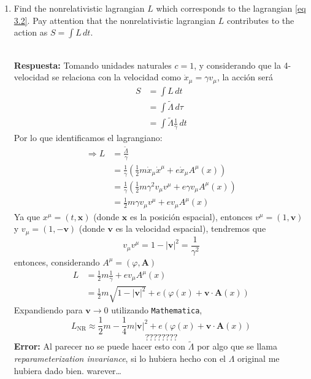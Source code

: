 \documentclass[]{article}
\numberwithin{equation}{section}
\newcommand{\0}{\textcolor{gray}{0}}
\newcommand{\n}[1]{\mathbf{#1}}
\newcommand{\resp}{
	\\
	
	\textbf{Respuesta:} }
\begin{document}
\begin{enumerate}
	\item[(d)] Find the nonrelativistic lagrangian $L$ which corresponds to the lagrangian \ref{eq 3.2}. Pay attention that the nonrelativistic lagrangian $L$ contributes to the action as $S = \int L \, dt$.
	\resp Tomando unidades naturales $c = 1$, y considerando que la 4-velocidad se relaciona con la velocidad como $\dot{x}_\mu = \gamma v_\mu$, la acción será
	\begin{align*}
		S &= \int L \, dt\\
		&= \int \tilde{\Lambda} \, d\tau \\
		&= \int \tilde{\Lambda} \frac{1}{\gamma} \, dt
	\end{align*}
	Por lo que identificamos el lagrangiano:
	\begin{align*}
		\Rightarrow L &= \frac{\tilde{\Lambda}}{\gamma}\\
		&= \frac{1}{\gamma} \left(\frac{1}{2} m \dot{x}_\mu \dot{x}^\mu + e\dot{x}_\mu A^\mu (x) \right)\\
		&= \frac{1}{\gamma} \left(\frac{1}{2} m \gamma^2 v_\mu v^\mu + e \gamma v_\mu A^\mu (x) \right)\\
		&= \frac{1}{2} m \gamma v_\mu v^\mu + e v_\mu A^\mu (x)
	\end{align*}
	Ya que $x^\mu = (t, \n{x})$ (donde $\n{x}$ es la posición espacial), entonces $v^\mu = (1, \n{v})$ y $v_\mu = (1, -\n{v})$ (donde $\n{v}$ es la velocidad espacial), tendremos que
	\begin{equation*}
		v_\mu v^\mu = 1 - |\n{v}|^2 = \frac{1}{\gamma^2}
	\end{equation*}
	entonces, considerando $A^\mu = (\varphi, \n{A})$
	\begin{align*}
		L &= \frac{1}{2} m \frac{1}{\gamma} + e v_\mu A^\mu (x)\\
		&= \frac{1}{2} m \sqrt{1 - |\n{v}|^2} + e \left(\varphi (x) + \n{v} \cdot \n{A} (x)\right)
	\end{align*}
	Expandiendo para $\n{v} \rightarrow 0$ utilizando \texttt{Mathematica},
	\begin{equation*}
		L_\mathrm{NR} \approx \frac{1}{2} m - \frac{1}{4} m |\n{v}|^2 + e \left(\varphi (x) + \n{v} \cdot \n{A} (x)\right)
	\end{equation*}
	\begin{equation*}
		????????
	\end{equation*}
	\textbf{Error:} Al parecer no se puede hacer esto con $\tilde{\Lambda}$ por algo que se llama \textit{reparameterization invariance}, si lo hubiera hecho con el $\Lambda$ original me hubiera dado bien. warever\ldots
\end{enumerate}
\end{document}
